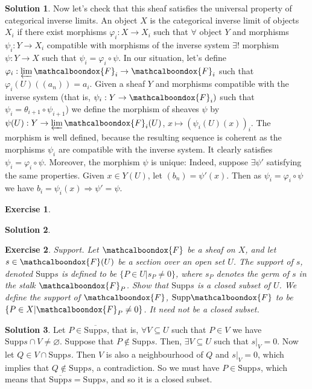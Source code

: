 \documentclass[12pt]{article}
\newcommand{\imp}{\ensuremath{\Rightarrow}}
\newtheorem{ex}{Exercise}[section]
\theoremstyle{definition}
\newtheorem*{sol}{Solution}
\newcommand{\sF}{\ensuremath{\mathcalboondox{F}}}
\begin{document}
\begin{sol}
	Now let's check that this sheaf satisfies the universal property of categorical inverse limits. An object $X$ is the categorical inverse limit of objects $X_i$ if there exist morphisms $\varphi_i: X \to X_i$ such that $\forall$ object $Y$ and morphisms $\psi_i: Y \to X_i$ compatible with morphisms of the inverse system $\exists !$ morphism $\psi: Y \to X$ such that $\psi_i = \varphi_i \circ \psi$. In our situation, let's define $\varphi_i: \varprojlim \sF_i \to \sF_i$ such that $\varphi_i(U)((a_n)) = a_i$. Given a sheaf $Y$ and morphisms compatible with the inverse system (that is, $\psi_i: Y \to \sF_i)$ such that $\psi_i = \theta_{i+1} \circ \psi_{i+1}$) we define the morphism of sheaves $\psi$ by $\psi(U): Y \to \varprojlim \sF_i(U)$, $x \mapsto (\psi_i(U)(x))_i$. The morphism is well defined, because the resulting sequence is coherent as the morphisms $\psi_i$ are compatible with the inverse system. It clearly satisfies $\psi_i = \varphi_i \circ \psi$. Moreover, the morphism $\psi$ is unique: Indeed, suppose $\exists \psi'$ satisfying the same properties. Given $x \in Y(U)$, let $(b_n) = \psi'(x)$. Then as $\psi_i = \varphi_i \circ \psi$ we have $b_i = \psi_i(x) \imp \psi' = \psi$. 
\end{sol}

\begin{ex}

\end{ex}

\begin{sol}

\end{sol}

\begin{ex}
	Support. Let $\sF$ be a sheaf on $X$, and let $s \in \sF(U)$ be a section over an open set $U$. The support of $s$, denoted $\mathrm{Supp} s$ is defined to be $\{P \in U |s_P \neq 0\}$, where $s_P$ denotes the germ of $s$ in the stalk $\sF_P$. Show that $\mathrm{Supp} s$ is a closed subset of $U$. We define the support of $\sF$, $\mathrm{Supp} \sF$ to be $\{P \in X | \sF_P \neq 0\}$. It need not be a closed subset.
\end{ex}

\begin{sol}
	Let $P \in \overline{\mathrm{Supp} s}$, that is, $\forall V \subseteq U$ such that $P \in V$ we have $\mathrm{Supp} s \cap V \neq \varnothing$. Suppose that $P \notin \mathrm{Supp} s$. Then, $\exists V \subseteq U$ such that $s|_V = 0$. Now let $Q \in V \cap \mathrm{Supp} s$. Then $V$ is also a neighbourhood of $Q$ and $s|_V = 0$, which implies that $Q \notin \mathrm{Supp} s$, a contradiction. So we must have $P \in \mathrm{Supp} s$, which means that $\overline{\mathrm{Supp} s} = \mathrm{Supp} s$, and so it is a closed subset. 
\end{sol}
\end{document}
